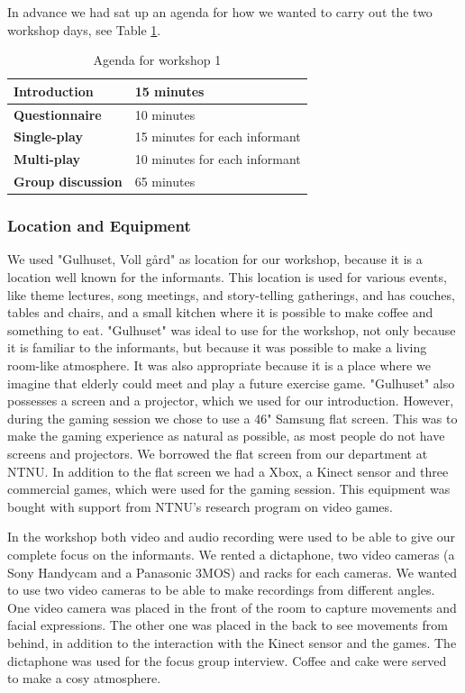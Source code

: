 In advance we had sat up an agenda for how we wanted to carry out the two workshop days,  see Table \ref{tab:agendaW1}.  

\begin{table} [H]
\centering
    \begin{tabular}{|l|l|}
       \hline
       \textbf{Introduction} & 15 minutes  \\ \hline
       \textbf{Questionnaire} & 10 minutes  \\ \hline
       \textbf{Single-play} & 15 minutes for each informant \\ \hline
       \textbf{Multi-play} & 10 minutes for each informant \\ \hline
	   \textbf{Group discussion} & 65 minutes \\ \hline
    \end{tabular}
    \caption[Workshop 1 agenda]{Agenda for workshop 1}
    \label{tab:agendaW1}
\end{table}  

\subsubsection{Location and Equipment}
We used "Gulhuset, Voll gård" as location for our workshop, because it is a location well known for the informants. This location is used for various events, like theme lectures, song meetings, and story-telling gatherings, and has couches, tables and chairs, and a small kitchen where it is possible to make coffee and something to eat. "Gulhuset" was ideal to use for the workshop, not only because it is familiar to the informants, but because it was possible to make a living room-like atmosphere. It was also appropriate because it is a place where we imagine that elderly could meet and play a future exercise game. "Gulhuset" also possesses a screen and a projector, which we used for our introduction. However, during the gaming session we chose to use a 46" Samsung flat screen. This was to make the gaming experience as natural as possible, as most people do not have screens and projectors. We borrowed the flat screen from our department at NTNU. In addition to the flat screen we had a Xbox, a Kinect sensor and three commercial games, which were used for the gaming session. This equipment was bought with support from NTNU's research program on video games.   

In the workshop both video and audio recording were used to be able to give our complete focus on the informants. We rented a dictaphone, two video cameras (a Sony Handycam and a Panasonic 3MOS) and racks for each cameras. We wanted to use two video cameras to be able to make recordings from different angles. One video camera was placed in the front of the room to capture movements and facial expressions. The other one was placed in the back to see movements from behind, in addition to the interaction with the Kinect sensor and the games. The dictaphone was used for the focus group interview. Coffee and cake were served to make a cosy atmosphere. 

